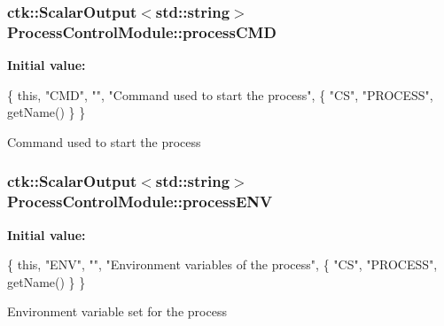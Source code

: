 \subsubsection[{\texorpdfstring{process\+C\+MD}{processCMD}}]{\setlength{\rightskip}{0pt plus 5cm}ctk\+::\+Scalar\+Output$<$std\+::string$>$ Process\+Control\+Module\+::process\+C\+MD}\hypertarget{structProcessControlModule_a6e686bbcec279a721b28814b645db76a}{}\label{structProcessControlModule_a6e686bbcec279a721b28814b645db76a}
{\bfseries Initial value\+:}
\begin{DoxyCode}
\{ \textcolor{keyword}{this}, \textcolor{stringliteral}{"CMD"}, \textcolor{stringliteral}{""}, \textcolor{stringliteral}{"Command used to start the process"},
    \{  \textcolor{stringliteral}{"CS"}, \textcolor{stringliteral}{"PROCESS"}, getName() \} \}
\end{DoxyCode}
Command used to start the process 
\subsubsection[{\texorpdfstring{process\+E\+NV}{processENV}}]{\setlength{\rightskip}{0pt plus 5cm}ctk\+::\+Scalar\+Output$<$std\+::string$>$ Process\+Control\+Module\+::process\+E\+NV}\hypertarget{structProcessControlModule_a6e9d90425d057f951f0b5c7a159bde30}{}\label{structProcessControlModule_a6e9d90425d057f951f0b5c7a159bde30}
{\bfseries Initial value\+:}
\begin{DoxyCode}
\{ \textcolor{keyword}{this}, \textcolor{stringliteral}{"ENV"}, \textcolor{stringliteral}{""}, \textcolor{stringliteral}{"Environment variables of the process"},
    \{  \textcolor{stringliteral}{"CS"}, \textcolor{stringliteral}{"PROCESS"}, getName() \} \}
\end{DoxyCode}
Environment variable set for the process 
